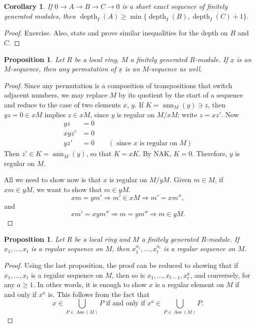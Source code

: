 \documentclass[11pt]{book}
\newtheorem{proposition}[theorem]{Proposition}
\newtheorem{corollary}[theorem]{Corollary}
\numberwithin{equation}{section}
\numberwithin{theorem}{chapter}
\theoremstyle{definition}
\newtheorem*{basic properties}{Basic Properties}
\newtheorem*{Important Remark}{Important Remark}
\theoremstyle{remark}
\newcommand{\Ass}{\operatorname{Ass}}
\newcommand{\ann}{\operatorname{ann}}
\newcommand{\depth}{\operatorname{depth}}
\begin{document}
\begin{corollary}
	If $0 \to A \to B \to C \to 0$ is a short exact sequence of finitely generated modules, then $\depth_I(A) \geq \min\{\depth_I(B), \depth_I(C)+1\}.$
\end{corollary}
\begin{proof}
	Exercise. Also, state and prove similar inequalities for the depth on $B$ and $C$.
\end{proof}

\begin{proposition}
	Let $R$ be a local ring, $M$ a finitely generated $R$-module. If $\underline{x}$ is an $M$-sequence, then any permutation of $\underline{x}$ is an $M$-sequence as well.
\end{proposition}

\begin{proof}
	Since any permutation is a composition of transpositions that switch adjacent numbers, we may replace $M$ by its quotient by the start of a sequence and reduce to the case of two elements $x$, $y$. If $K = \ann_M(y) \ni z$, then $yz=0 \in xM$ implies $z \in xM$, since $y$ is regular on $M/xM$; write $z = xz'$. Now
	\begin{align*}
		yz & = 0 \\ 
		xyz' & = 0 \\
		yz' & = 0 \qquad (\textrm{ since $x$ is regular on $M$})
	\end{align*}
	Then $z' \in K = \ann_M(y)$, so that $K = xK$. By NAK, $K = 0$. Therefore, $y$ is regular on $M$.
	
All we need to show now is that $x$ is regular on $M/yM$. Given $m \in M$, if $xm \in yM$, we want to show that $m \in yM$.
$$xm = ym' \Rightarrow m' \in xM \Rightarrow m' = xm'',$$
and
$$xm'=xym'' \Rightarrow m = ym'' \Rightarrow m \in yM.$$
\end{proof}


\begin{proposition}
	Let $R$ be a local ring and $M$ a finitely generated $R$-module. If $x_1, \ldots, x_t$ is a regular sequence on $M$, then $x_1^{a_1}, \ldots, x_t^{a_t}$ is a regular sequence on $M$.
\end{proposition}

\begin{proof}
	Using the last proposition, the proof can be reduced to showing that if $x_1, \ldots, x_t$ is a regular sequence on $M$, then so is $x_1, \ldots, x_{t-1}, x_t^a$, and conversely, for any $a \geqslant 1$. In other words, it is enough to show $x$ is a regular element on $M$ if and only if $x^a$ is. This follows from the fact that
	$$x \in \bigcup_{P \in \Ass(M)} P \textrm{ if and only if } x^a \in \bigcup_{P \in \Ass(M)} P.$$
\end{proof}
\end{document}
